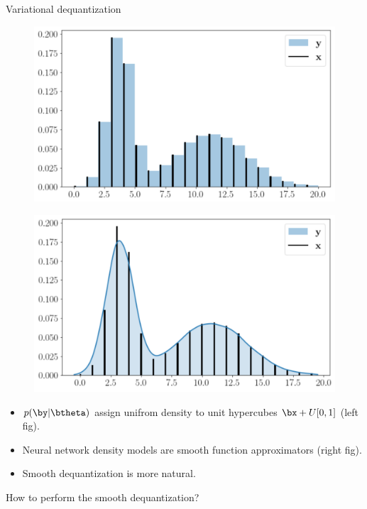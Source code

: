 \begin{frame}{Variational dequantization}
	\begin{minipage}[t]{0.5\columnwidth}
			\begin{figure}
				\centering
				\includegraphics[width=1.0\linewidth]{figs/uniform_dequantization.png}
			\end{figure}
	\end{minipage}%
	\begin{minipage}[t]{0.5\columnwidth}
		\begin{figure}
			\centering
			\includegraphics[width=1.0\linewidth]{figs/variational_dequantization.png}
		\end{figure}
	\end{minipage}
	\begin{itemize}
		\item $p(\by | \btheta)$ assign unifrom density to unit hypercubes $\bx + U[0, 1]$ (left fig).
		\item Neural network density models are smooth function approximators (right fig).
		\item Smooth dequantization is more natural.
	\end{itemize}
	How to perform the smooth dequantization? \\
\end{frame}
